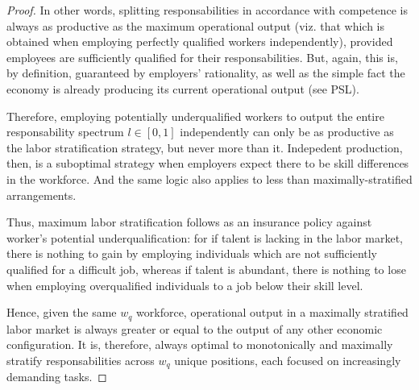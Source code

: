 \documentclass[hidelinks, nonatbib]{elsarticle}
\begin{document}
\begin{lemma}
\begin{proof}
        In other words, splitting responsabilities in accordance with competence is always as productive as the maximum operational output (viz. that which is obtained when employing perfectly qualified workers independently), provided employees are sufficiently qualified for their responsabilities. But, again, this is, by definition, guaranteed by employers' rationality, as well as the simple fact the economy is already producing its current operational output (see PSL). 
        
        Therefore, employing potentially underqualified workers to output the entire responsability spectrum $l \in [0,1]$ independently can only be as productive as the labor stratification strategy, but never more than it. Indepedent production, then, is a suboptimal strategy when employers expect there to be skill differences in the workforce. And the same logic also applies to less than maximally-stratified arrangements.
        
        Thus, maximum labor stratification follows as an insurance policy against worker's potential underqualification: for if talent is lacking in the labor market, there is nothing to gain by employing individuals which are not sufficiently qualified for a difficult job, whereas if talent is abundant, there is nothing to lose when employing overqualified individuals to a job below their skill level.

        Hence, given the same $w_q$ workforce, operational output in a maximally stratified labor market is always greater or equal to the output of any other economic configuration. It is, therefore, always optimal to monotonically and maximally stratify responsabilities across $w_q$ unique positions, each focused on increasingly demanding tasks.
    \end{proof}
\end{lemma}
\end{document}
